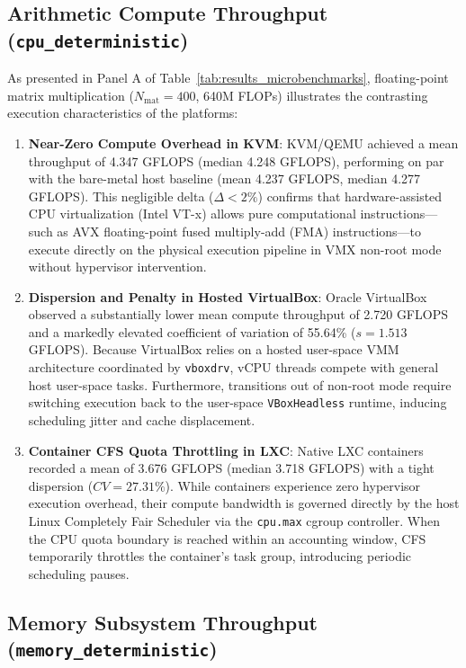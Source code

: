 \subsection{Arithmetic Compute Throughput (\texttt{cpu\_deterministic})}
\label{subsec:results_cpu}

As presented in Panel A of Table~\ref{tab:results_microbenchmarks}, floating-point matrix multiplication ($N_{\text{mat}} = 400$, 640M FLOPs) illustrates the contrasting execution characteristics of the platforms:
\begin{enumerate}
    \item \textbf{Near-Zero Compute Overhead in KVM}: KVM/QEMU achieved a mean throughput of 4.347 GFLOPS (median 4.248 GFLOPS), performing on par with the bare-metal host baseline (mean 4.237 GFLOPS, median 4.277 GFLOPS). This negligible delta ($\Delta < 2\%$) confirms that hardware-assisted CPU virtualization (Intel VT-x) allows pure computational instructions—such as AVX floating-point fused multiply-add (FMA) instructions—to execute directly on the physical execution pipeline in VMX non-root mode without hypervisor intervention.
    \item \textbf{Dispersion and Penalty in Hosted VirtualBox}: Oracle VirtualBox observed a substantially lower mean compute throughput of 2.720 GFLOPS and a markedly elevated coefficient of variation of 55.64\% ($s = 1.513$ GFLOPS). Because VirtualBox relies on a hosted user-space VMM architecture coordinated by \texttt{vboxdrv}, vCPU threads compete with general host user-space tasks. Furthermore, transitions out of non-root mode require switching execution back to the user-space \texttt{VBoxHeadless} runtime, inducing scheduling jitter and cache displacement.
    \item \textbf{Container CFS Quota Throttling in LXC}: Native LXC containers recorded a mean of 3.676 GFLOPS (median 3.718 GFLOPS) with a tight dispersion ($CV = 27.31\%$). While containers experience zero hypervisor execution overhead, their compute bandwidth is governed directly by the host Linux Completely Fair Scheduler via the \texttt{cpu.max} cgroup controller. When the CPU quota boundary is reached within an accounting window, CFS temporarily throttles the container's task group, introducing periodic scheduling pauses.
\end{enumerate}

\subsection{Memory Subsystem Throughput (\texttt{memory\_deterministic})}
\label{subsec:results_memory}

